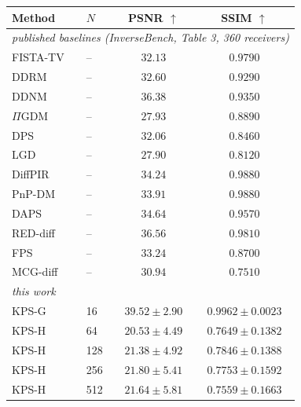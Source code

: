 \small
\begin{tabular}{llcc}
\toprule
Method & $N$ & PSNR $\uparrow$ & SSIM $\uparrow$ \\
\midrule
\multicolumn{4}{l}{\emph{published baselines (InverseBench, Table 3, 360 receivers)}} \\
FISTA-TV & -- & $32.13$ & $0.9790$ \\
DDRM & -- & $32.60$ & $0.9290$ \\
DDNM & -- & $36.38$ & $0.9350$ \\
$\Pi$GDM & -- & $27.93$ & $0.8890$ \\
DPS & -- & $32.06$ & $0.8460$ \\
LGD & -- & $27.90$ & $0.8120$ \\
DiffPIR & -- & $34.24$ & $0.9880$ \\
PnP-DM & -- & $33.91$ & $0.9880$ \\
DAPS & -- & $34.64$ & $0.9570$ \\
RED-diff & -- & $36.56$ & $0.9810$ \\
FPS & -- & $33.24$ & $0.8700$ \\
MCG-diff & -- & $30.94$ & $0.7510$ \\
\midrule
\multicolumn{4}{l}{\emph{this work}} \\
KPS-G & 16 & $39.52 \pm 2.90$ & $0.9962 \pm 0.0023$ \\
KPS-H & 64 & $20.53 \pm 4.49$ & $0.7649 \pm 0.1382$ \\
KPS-H & 128 & $21.38 \pm 4.92$ & $0.7846 \pm 0.1388$ \\
KPS-H & 256 & $21.80 \pm 5.41$ & $0.7753 \pm 0.1592$ \\
KPS-H & 512 & $21.64 \pm 5.81$ & $0.7559 \pm 0.1663$ \\
\bottomrule
\end{tabular}
